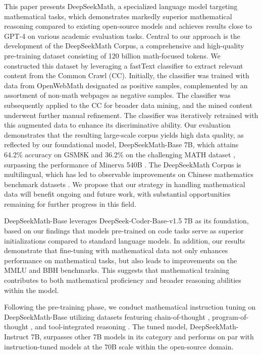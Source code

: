 This paper presents DeepSeekMath, a specialized language model targeting mathematical tasks, which demonstrates markedly superior mathematical reasoning compared to existing open-source models and achieves results close to GPT-4 on various academic evaluation tasks. Central to our approach is the development of the DeepSeekMath Corpus, a comprehensive and high-quality pre-training dataset consisting of 120 billion math-focused tokens. We constructed this dataset by leveraging a fastText classifier \citep{joulin2016fasttext} to extract relevant content from the Common Crawl (CC). Initially, the classifier was trained with data from OpenWebMath \citep{openwebmath} designated as positive samples, complemented by an assortment of non-math webpages as negative samples. The classifier was subsequently applied to the CC for broader data mining, and the mined content underwent further manual refinement. The classifier was iteratively retrained with this augmented data to enhance its discriminative ability. Our evaluation demonstrates that the resulting large-scale corpus yields high data quality, as reflected by our foundational model, DeepSeekMath-Base 7B, which attains 64.2\% accuracy on GSM8K \citep{gsm8k} and 36.2\% on the challenging MATH dataset \citep{MATH}, surpassing the performance of Minerva 540B \citep{minerva}. The DeepSeekMath Corpus is multilingual, which has led to observable improvements on Chinese mathematics benchmark datasets \citep{wei2023cmath,agieval}. We propose that our strategy in handling mathematical data will benefit ongoing and future work, with substantial opportunities remaining for further progress in this field.

DeepSeekMath-Base leverages DeepSeek-Coder-Base-v1.5 7B \citep{deepseek-coder} as its foundation, based on our findings that models pre-trained on code tasks serve as superior initializations compared to standard language models. In addition, our results demonstrate that fine-tuning with mathematical data not only enhances performance on mathematical tasks, but also leads to improvements on the MMLU \citep{mmlu} and BBH \citep{bbh} benchmarks. This suggests that mathematical training contributes to both mathematical proficiency and broader reasoning abilities within the model.

Following the pre-training phase, we conduct mathematical instruction tuning on DeepSeekMath-Base utilizing datasets featuring chain-of-thought \citep{cot}, program-of-thought \citep{pot,pal}, and tool-integrated reasoning \citep{tora}. The tuned model, DeepSeekMath-Instruct 7B, surpasses other 7B models in its category and performs on par with instruction-tuned models at the 70B scale within the open-source domain.

